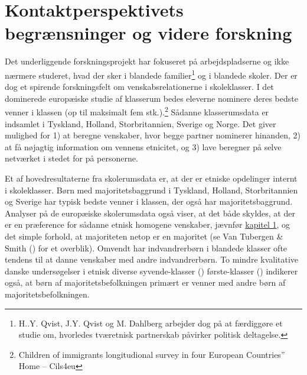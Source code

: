 \documentclass[
]{book}
\begin{document}
\section{Kontaktperspektivets begrænsninger og videre forskning}\label{kontaktperspektivets-begruxe6nsninger-og-videre-forskning}

Det underliggende forskningsprojekt har fokuseret på arbejdspladserne og ikke nærmere studeret, hvad der sker i blandede familier\footnote{H..Y. Qvist, J.Y. Qvist og M. Dahlberg arbejder dog på at færdiggøre et studie om, hvorledes tværetnisk partnerskab påvirker politisk deltagelse.} og i blandede skoler. Der er dog et spirende forskningsfelt om venskabsrelationerne i skoleklasser. I det dominerede europæiske studie af klasserum bedes eleverne nominere deres bedste venner i klassen (op til maksimalt fem stk.).\footnote{Children of immigrants longitudional survey in four European Countries'' Home -- Cils4eu} Sådanne klasserumsdata er indsamlet i Tyskland, Holland, Storbritannien, Sverige og Norge. Det giver mulighed for 1) at beregne venskaber, hvor begge partner nominerer hinanden, 2) at få nøjagtig information om vennens etnicitet, og 3) lave beregner på selve netværket i stedet for på personerne.

Et af hovedresultaterne fra skolerumsdata er, at der er etniske opdelinger internt i skoleklasser. Børn med majoritetsbaggrund i Tyskland, Holland, Storbritannien og Sverige har typisk bedste venner i klassen, der også har majoritetsbaggrund. Analyser på de europæiske skolerumsdata også viser, at det både skyldes, at der er en præference for sådanne etnisk homogene venskaber, jævnfør \hyperref[kap1]{kapitel 1}, og det simple forhold, at majoriteten netop er en majoritet (se Van Tubergen \& Smith () for et overblik). Omvendt har indvandrerbørn i blandede klasser ofte tendens til at danne venskaber med andre indvandrerbørn. To mindre kvalitative danske undersøgelser i etnisk diverse syvende-klasser () første-klasser () indikerer også, at børn af majoritetsbefolkningen primært er venner med andre børn af majoritetsbefolkningen.
\end{document}
